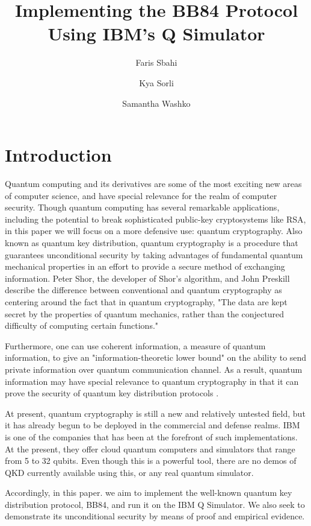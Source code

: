\documentclass[12]{amsart}
\title[CS590 Computer Security Final Project]{Implementing the BB84 Protocol Using IBM's Q Simulator}
\author{Faris Sbahi}
\author{Kya Sorli}
\author{Samantha Washko}
\begin{document}
\maketitle

\section{Introduction}

Quantum computing and its derivatives are some of the most exciting new areas of computer science, and have special relevance for the realm of computer security. Though quantum computing has several remarkable applications, including the potential to break sophisticated public-key cryptosystems like RSA\cite{text}, in this paper we will focus on a more defensive use:  quantum cryptography. Also known as quantum key distribution, quantum cryptography is a procedure that guarantees unconditional security \cite{challenge} by taking advantages of fundamental quantum mechanical properties in an effort to provide a secure method of exchanging information\cite{text}. Peter Shor, the developer of Shor's algorithm, and John Preskill describe the difference between conventional and quantum cryptography as centering around the fact that in quantum cryptography, "The data are kept secret by the properties of quantum mechanics, rather than the conjectured difficulty of computing certain functions."\cite{bb84}

Furthermore, one can use coherent information, a measure of quantum information, to give an "information-theoretic lower bound" on the ability to send private information over quantum communication channel. As a result, quantum information may have special relevance to quantum cryptography in that it can prove the security of quantum key distribution protocols \cite{text}.

At present, quantum cryptography is still a new and relatively untested field, but it has already begun to be deployed in the commercial and defense realms\cite{sat}\cite{challenge}. IBM is one of the companies that has been at the forefront of such implementations. At the present, they offer cloud quantum computers and simulators that range from 5 to 32 qubits. Even though this is a powerful tool, there are no demos of QKD currently available using this, or any real quantum simulator.

Accordingly, in this paper. we aim to implement the well-known quantum key distribution protocol, BB84, and run it on the IBM Q Simulator. We also seek to demonstrate its unconditional security by means of proof and empirical evidence.
\end{document}
